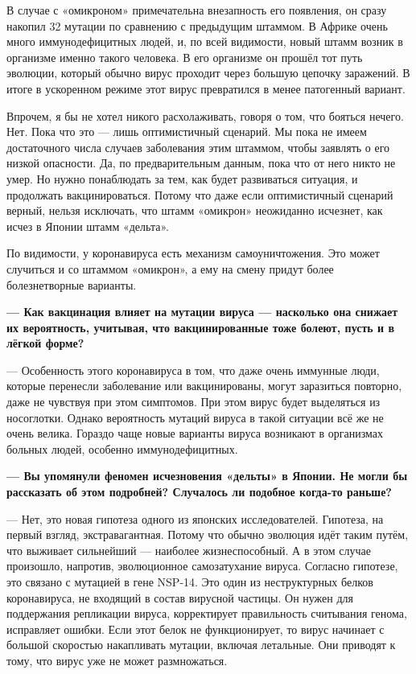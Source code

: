 В случае с «омикроном» примечательна внезапность его появления, он сразу накопил 32 мутации по сравнению с предыдущим штаммом. В Африке очень много иммунодефицитных людей, и, по всей видимости, новый штамм возник в организме именно такого человека. В его организме он прошёл тот путь эволюции, который обычно вирус проходит через большую цепочку заражений. В итоге в ускоренном режиме этот вирус превратился в менее патогенный вариант.

Впрочем, я бы не хотел никого расхолаживать, говоря о том, что бояться нечего. Нет. Пока что это — лишь оптимистичный сценарий. Мы пока не имеем достаточного числа случаев заболевания этим штаммом, чтобы заявлять о его низкой опасности. Да, по предварительным данным, пока что от него никто не умер. Но нужно понаблюдать за тем, как будет развиваться ситуация, и продолжать вакцинироваться. Потому что даже если оптимистичный сценарий верный, нельзя исключать, что штамм «омикрон» неожиданно исчезнет, как исчез в Японии штамм «дельта».

По видимости, у коронавируса есть механизм самоуничтожения. Это может случиться и со штаммом «омикрон», а ему на смену придут более болезнетворные варианты.

{\bf — Как вакцинация влияет на мутации вируса — насколько она снижает их вероятность, учитывая, что вакцинированные тоже болеют, пусть и в лёгкой форме?}

— Особенность этого коронавируса в том, что даже очень иммунные люди, которые перенесли заболевание или вакцинированы, могут заразиться повторно, даже не чувствуя при этом симптомов. При этом вирус будет выделяться из носоглотки. Однако вероятность мутаций вируса в такой ситуации всё же не очень велика. Гораздо чаще новые варианты вируса возникают в организмах больных людей, особенно иммунодефицитных.

{\bf — Вы упомянули феномен исчезновения «дельты» в Японии. Не могли бы рассказать об этом подробней? Случалось ли подобное когда-то раньше? }

— Нет, это новая гипотеза одного из японских исследователей. Гипотеза, на первый взгляд, экстравагантная. Потому что обычно эволюция идёт таким путём, что выживает сильнейший — наиболее жизнеспособный. А в этом случае произошло, напротив, эволюционное самозатухание вируса. Согласно гипотезе, это связано с мутацией в гене NSP-14. Это один из неструктурных белков коронавируса, не входящий в состав вирусной частицы. Он нужен для поддержания репликации вируса, корректирует правильность считывания генома, исправляет ошибки. Если этот белок не функционирует, то вирус начинает с большой скоростью накапливать мутации, включая летальные. Они приводят к тому, что вирус уже не может размножаться.

